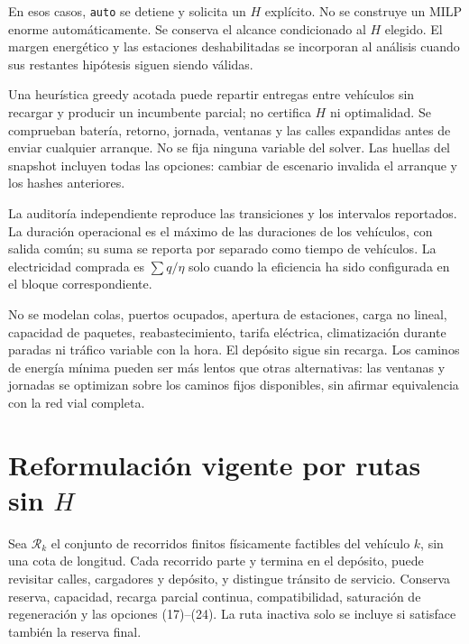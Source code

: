 \documentclass[11pt,a4paper]{article}
\newcommand{\code}[1]{\texttt{\small #1}}
\begin{document}
En esos casos, \code{auto} se detiene y solicita un $H$ explícito. No se
construye un MILP enorme automáticamente. Se conserva el alcance condicionado
al $H$ elegido. El margen energético y las estaciones deshabilitadas se
incorporan al análisis cuando sus restantes hipótesis siguen siendo válidas.

Una heurística greedy acotada puede repartir entregas entre vehículos sin
recargar y producir un incumbente parcial; no certifica $H$ ni optimalidad.
Se comprueban batería, retorno, jornada, ventanas y las calles expandidas antes
de enviar cualquier arranque. No se fija ninguna variable del solver. Las
huellas del snapshot incluyen todas las opciones: cambiar de escenario invalida
el arranque y los hashes anteriores.

La auditoría independiente reproduce las transiciones y los intervalos
reportados. La duración operacional es el máximo de las duraciones de los
vehículos, con salida común; su suma se reporta por separado como tiempo de
vehículos. La electricidad comprada es $\sum q/\eta$ solo cuando la eficiencia
ha sido configurada en el bloque correspondiente.

No se modelan colas, puertos ocupados, apertura de estaciones, carga no lineal,
capacidad de paquetes, reabastecimiento, tarifa eléctrica, climatización
durante paradas ni tráfico variable con la hora. El depósito sigue sin recarga.
Los caminos de energía mínima pueden ser más lentos que otras alternativas:
las ventanas y jornadas se optimizan sobre los caminos fijos disponibles,
sin afirmar equivalencia con la red vial completa.

\clearpage
\section{Reformulación vigente por rutas sin $H$}
Sea $\mathcal R_k$ el conjunto de recorridos finitos físicamente factibles del
vehículo $k$, sin una cota de longitud. Cada recorrido parte y termina en el
depósito, puede revisitar calles, cargadores y depósito, y distingue tránsito
de servicio. Conserva reserva, capacidad, recarga parcial continua, compatibilidad,
saturación de regeneración y las opciones (17)--(24).
La ruta inactiva solo se incluye si satisface también la reserva final.
\end{document}
